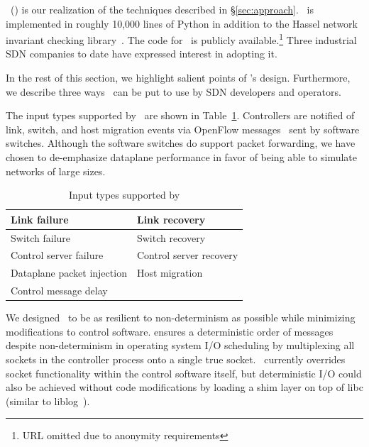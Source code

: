 \projectname~(\projectmeaning) is our realization of the techniques described in
\S\ref{sec:approach}. \projectname~is implemented in roughly 10,000 lines of Python in
addition to the Hassel network invariant checking library~\cite{hsa}. The code
for \projectname~is publicly available.\footnote{URL omitted due to anonymity requirements}
Three industrial SDN companies to date have expressed interest in adopting it.

In the rest of this section, we highlight salient points of \projectname's
design. Furthermore, we describe three ways \projectname~can be put to use
by SDN developers and operators.

The input types supported by \projectname~are shown in Table~\ref{tab:inputs}.
Controllers are notified of link, switch, and host migration events
via OpenFlow messages~\cite{openflow} sent by software switches.
Although the software switches do support packet forwarding, we
have chosen to de-emphasize dataplane performance in favor of
being able to simulate networks of large sizes. %

\begin{table}
\centering
\begin{tabular}{|l|l|}
\hline
Link failure & Link recovery \\
\hline
Switch failure & Switch recovery \\
\hline
Control server failure & Control server recovery \\
\hline
Dataplane packet injection & Host migration \\
\hline
Control message delay & \\
\hline
\end{tabular}
\caption{Input types supported by \projectname}
\label{tab:inputs}
\end{table}

We designed \projectname~to be as resilient to non-determinism as possible
while minimizing modifications to control software.
\projectname ensures a deterministic order of messages despite
non-determinism in operating system I/O scheduling
by multiplexing all sockets in the controller process
onto a single true socket. \projectname~currently
overrides socket functionality within the control software itself, but
deterministic I/O could also be achieved without code modifications by
loading a shim layer on top of
libc (similar to liblog~\cite{Geels:2006:RDD:1267359.1267386}).

